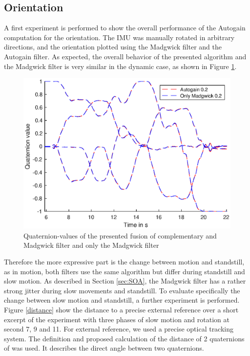 \documentclass[letterpaper, 10 pt, conference]{ieeeconf}  %
\begin{document}
\subsection{Orientation}
A first experiment is performed to show the overall performance of the Autogain computation for the orientation. The IMU was manually rotated in arbitrary directions, and the orientation plotted using the Madgwick filter and the Autogain filter.
As expected, the overall behavior of the presented algorithm and the Madgwick filter is very similar in the dynamic case, as shown in Figure \ref{quaternion1}.
\begin{figure}
\includegraphics[width=\linewidth]{./graphics/AutoVsMad.eps}
\caption{Quaternion-values of the presented fusion of complementary and Madgwick filter and only the Madgwick filter}
\label{quaternion1}
\end{figure}
Therefore the more expressive part is the change between motion and standstill, as in motion, both filters use the same algorithm but differ during standstill and slow motion.
As described in Section \ref{sec:SOA}, the Madgwick filter has a rather strong jitter during slow movements and standstill. 
To evaluate specifically the change between slow motion and standstill, a further experiment is performed.
Figure \ref{distance} show the distance to a precise external reference over a short excerpt of the experiment with three phases of slow motion and rotation at second 7, 9 and 11. 
For external reference, we used a precise optical tracking system. 
The definition and proposed calculation of the distance of 2 quaternions of \cite{kuffner2004effectiveDistance} was used.
It describes the direct angle between two quaternions.
\end{document}

